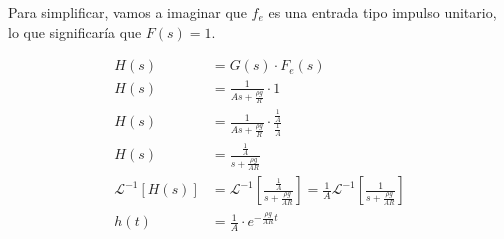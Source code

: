 \documentclass{article}
\begin{document}
Para simplificar, vamos a imaginar que $f_e$ es una entrada tipo impulso unitario, lo que significaría que $F\left(s\right) = 1$.

\begin{align*}
    H\left(s\right) &= G\left(s\right) \cdot F_e\left(s\right) \\
    H\left(s\right) &= \frac{1}{As + \frac{\rho g}{R}} \cdot 1 \\
    H\left(s\right) &= \frac{1}{As + \frac{\rho g}{R}} \cdot \frac{\frac{1}{A}}{\frac{1}{A}} \\
    H\left(s\right) &= \frac{\frac{1}{A}}{s + \frac{\rho g}{AR}} \\
    \mathcal{L}^{-1}\left[H\left(s\right)\right] &= \mathcal{L}^{-1}\left[\frac{\frac{1}{A}}{s + \frac{\rho g}{AR}}\right] = \frac{1}{A}\mathcal{L}^{-1}\left[\frac{1}{s + \frac{\rho g}{AR}}\right]\\
    h\left(t\right) &= \frac{1}{A} \cdot e^{-\frac{\rho g}{AR} t} \\
\end{align*}
\end{document}
